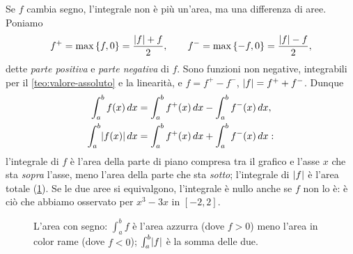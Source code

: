 Se $f$ cambia segno, l'integrale non è più un'area, ma una differenza di aree. Poniamo
\begin{equation}\label{eq:parte-positiva-negativa}
  f^{+}=\max\left\{ f,0 \right\}=\frac{\lvert f\rvert+f}2, \qquad f^{-}=\max\left\{ -f,0 \right\}=\frac{\lvert f\rvert-f}2 ,
\end{equation}
dette \emph{parte positiva} e \emph{parte negativa} di $f$. Sono funzioni non negative,
integrabili per il \cref{teo:valore-assoluto} e la linearità, e $f=f^{+}-f^{-}$,
$\lvert f\rvert=f^{+}+f^{-}$. Dunque
\begin{equation}\label{eq:area-segno}
\begin{aligned}
  \int_{a}^{b}f(x)\,dx&=\int_{a}^{b}f^{+}(x)\,dx-\int_{a}^{b}f^{-}(x)\,dx,\\
  \int_{a}^{b}\lvert f(x)\rvert\,dx&=\int_{a}^{b}f^{+}(x)\,dx+\int_{a}^{b}f^{-}(x)\,dx :
\end{aligned}
\end{equation}
l'integrale di $f$ è l'area della parte di piano compresa tra il grafico e l'asse $x$ che
sta \emph{sopra} l'asse, meno l'area della parte che sta \emph{sotto}; l'integrale di
$\lvert f\rvert$ è l'area totale (\cref{fig:area-segno}). Se le due aree si equivalgono,
l'integrale è nullo anche se $f$ non lo è: è ciò che abbiamo osservato per
$x^{3}-3x$ in $[-2,2]$.

\begin{figure}[htb]
\centering
{}
\caption{L'area con segno: $\int_{a}^{b}f$ è l'area azzurra (dove $f>0$) meno l'area
in color rame (dove $f<0$); $\int_{a}^{b}\lvert f\rvert$ è la somma delle due.}
\label{fig:area-segno}
\end{figure}

